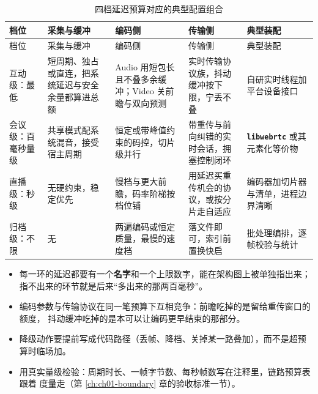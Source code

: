 \documentclass[12pt,a4paper,fontset=fandol]{ctexbook}
\newcommand{\Lib}[1]{\textbf{\texttt{#1}}}
\newcommand{\Lang}[1]{\textsf{#1}}
\newcommand{\DomAud}{\Lang{Audio}}
\newcommand{\DomVid}{\Lang{Video}}
\begin{document}
\small
\begin{longtable}{>{\raggedright\arraybackslash}p{}
                  >{\raggedright\arraybackslash}p{}
                  >{\raggedright\arraybackslash}p{}
                  >{\raggedright\arraybackslash}p{}
                  >{\raggedright\arraybackslash}p{}}
\caption{四档延迟预算对应的典型配置组合}\label{tab:apC-latency} \\
\toprule
档位 & 采集与缓冲 & 编码侧 & 传输侧 & 典型装配 \\
\midrule
\endfirsthead
\toprule
档位 & 采集与缓冲 & 编码侧 & 传输侧 & 典型装配 \\
\midrule
\endhead
\midrule
\endfoot
\bottomrule
\endlastfoot
互动级：最低 & 短周期、独占或直连，把系统延迟与安全余量都算进总额 & \DomAud{} 用短包长且不叠多余缓冲；\DomVid{} 关前瞻与双向预测 & 实时传输协议族，抖动缓冲按下限，宁丢不叠 & 自研实时线程加平台设备接口 \\
会议级：百毫秒量级 & 共享模式配系统混音，接受宿主周期 & 恒定或带峰值约束的码控，切片级并行 & 带重传与前向纠错的实时会话，拥塞控制闭环 & \Lib{libwebrtc} 或其元素化等价物 \\
直播级：秒级 & 无硬约束，稳定优先 & 慢档与更大前瞻，码率阶梯按档位铺 & 用延迟买重传机会的协议，或按分片走自适应 & 编码器加切片器与清单，进程边界清晰 \\
归档级：不限 & 无 & 两遍编码或恒定质量，最慢的速度档 & 落文件即可，索引前置换快启 & 批处理编排，逐帧校验与统计 \\
\end{longtable}
\normalsize

\begin{bestpractice}[title={决策链的四条检查项}]
\begin{itemize}
\item 每一环的延迟都要有一个\textbf{名字}和一个上限数字，能在架构图上被单独指出来；
      指不出来的环节就是后来``多出来的那两百毫秒''。
\item 编码参数与传输协议在同一笔预算下互相竞争：前瞻吃掉的是留给重传窗口的额度，
      抖动缓冲吃掉的是本可以让编码更早结束的那部分。
\item 降级动作要提前写成代码路径（丢帧、降档、关掉某一路叠加），而不是超预算时临场加。
\item 用真实量级检验：周期时长、一帧字节数、每秒帧数写在注释里，链路预算表跟着
      度量走（第 \ref{ch:ch01-boundary} 章的验收标准一节）。
\end{itemize}
\end{bestpractice}
\end{document}
